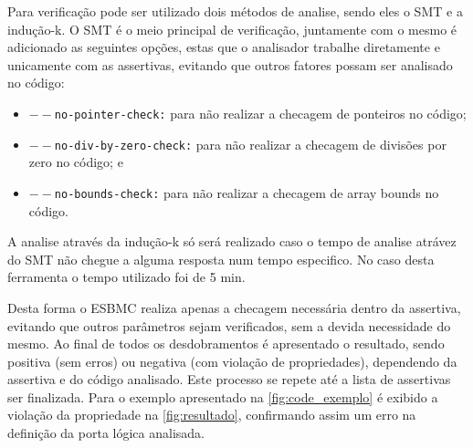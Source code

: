 \par
Para verificação pode ser utilizado dois métodos de analise, sendo eles o SMT e a indução-k. O SMT é o meio principal de verificação, juntamente com o mesmo é adicionado as seguintes opções, estas que o analisador trabalhe diretamente e unicamente com as assertivas, evitando que outros fatores possam ser analisado no código:
\begin{itemize}
    \item \texttt{$--$no-pointer-check:} para não realizar a checagem de ponteiros no código;
    \item \texttt{$--$no-div-by-zero-check:} para não realizar a checagem de divisões por zero no código; e
    \item \texttt{$--$no-bounds-check:} para não realizar a checagem de array bounds no código.
\end{itemize}

\par
A analise através da indução-k só será realizado caso o tempo de analise atrávez do SMT não chegue a alguma resposta num tempo especifico. No caso desta ferramenta o tempo utilizado foi de 5 min.

\par
Desta forma o ESBMC realiza apenas a checagem necessária dentro da assertiva, evitando que outros parâmetros sejam verificados, sem a devida necessidade do mesmo. Ao final de todos os desdobramentos é apresentado o resultado, sendo positiva (sem erros) ou negativa (com violação de propriedades), dependendo da assertiva e do código analisado. Este processo se repete até a lista de assertivas ser finalizada. Para o exemplo apresentado na \autoref{fig:code_exemplo} é exibido a violação da propriedade na \autoref{fig:resultado}, confirmando assim um erro na definição da porta lógica analisada.
